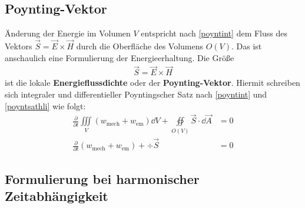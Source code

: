   \subsection{Poynting-Vektor}
		  Änderung der Energie im Volumen $V$ entspricht nach \ref{poyntint} dem Fluss des Vektors $\vec{S}= \vec{E} \times \vec{H} $ durch die Oberfläche des Volumens $O(V)$. Das ist anschaulich eine Formulierung der Energieerhaltung.
		   Die Größe
		        \begin{equation}\begin{split}
				        \boxed{\vec{S}= \vec{E} \times \vec{H} } 
			        \end{split}\end{equation}
		        ist die lokale \textbf{Energieflussdichte} oder der \textbf{Poynting-Vektor}.
		   Hiermit schreiben sich integraler und differentieller Poyntingscher Satz nach \ref{poyntint} und \ref{poyntsathli} wie folgt:
		        \begin{align}
			        \frac{\partial}{\partial t} \iiint\limits_V \left( w_\text{mech} + w_\text{em} \right) \dd V + \oiint\limits_{O(V)} \vec{S} \cdot \dd\vec{A} & = 0 \\
			        \frac{\partial}{\partial t} \left( w_\text{mech} + w_\text{em} \right) + \div \vec{S}                                                        & =0
		    \end{align}
  \subsection{Formulierung bei harmonischer Zeitabhängigkeit}
